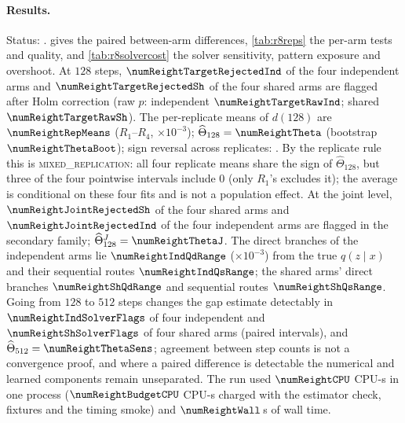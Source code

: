 \documentclass{article}
\theoremstyle{plain}
\theoremstyle{definition}
\theoremstyle{remark}
\begin{document}
\paragraph{Results.}
Status: \numReightStatus.  gives the paired between-arm differences, \cref{tab:r8reps} the per-arm tests and quality, and \cref{tab:r8solvercost} the solver sensitivity, pattern exposure and overshoot.
At $128$ steps, $\numReightTargetRejectedInd$ of the four independent arms and $\numReightTargetRejectedSh$ of the four shared arms are flagged after Holm correction (raw $p$: independent $\numReightTargetRawInd$; shared $\numReightTargetRawSh$). The per-replicate means of $d(128)$ are $\numReightRepMeans$ ($R_1$--$R_4$, $\times10^{-3}$); $\widehat\Theta_{128}=\numReightTheta$ (bootstrap $\numReightThetaBoot$); sign reversal across replicates: \numReightReversal. By the replicate rule this is \textsc{mixed\_replication}: all four replicate means share the sign of $\widehat\Theta_{128}$, but three of the four pointwise intervals include $0$ (only $R_1$'s excludes it); the average is conditional on these four fits and is not a population effect.
At the joint level, $\numReightJointRejectedSh$ of the four shared arms and $\numReightJointRejectedInd$ of the four independent arms are flagged in the secondary family; $\widehat\Theta^{J}_{128}=\numReightThetaJ$.
The direct branches of the independent arms lie $\numReightIndQdRange$ ($\times10^{-3}$) from the true $q(z\mid x)$ and their sequential routes $\numReightIndQsRange$; the shared arms' direct branches $\numReightShQdRange$ and sequential routes $\numReightShQsRange$.
Going from $128$ to $512$ steps changes the gap estimate detectably in $\numReightIndSolverFlags$ of four independent and $\numReightShSolverFlags$ of four shared arms (paired intervals), and $\widehat\Theta_{512}=\numReightThetaSens$; agreement between step counts is not a convergence proof, and where a paired difference is detectable the numerical and learned components remain unseparated.
The run used $\numReightCPU$ CPU-s in one process ($\numReightBudgetCPU$ CPU-s charged with the estimator check, fixtures and the timing smoke) and $\numReightWall$\,s of wall time.
\end{document}
